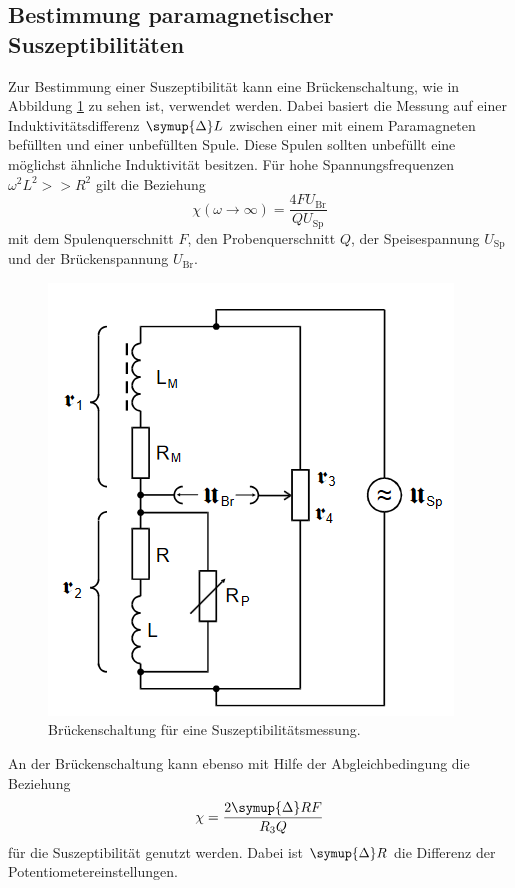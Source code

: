 \subsection{Bestimmung paramagnetischer Suszeptibilitäten}
Zur Bestimmung einer Suszeptibilität kann eine Brückenschaltung, wie in Abbildung \ref{fig:sus} zu sehen ist, verwendet werden. 
Dabei basiert die Messung auf einer Induktivitätsdifferenz $\symup{\Delta}L$ zwischen einer mit einem Paramagneten befüllten und einer unbefüllten Spule.
Diese Spulen sollten unbefüllt eine möglichst ähnliche Induktivität besitzen.
Für hohe Spannungsfrequenzen $\omega^2 L^2 >> R^2$ gilt die Beziehung
\begin{equation}
    \chi\left(\omega \to \infty \right) =\frac{4 F U_\text{Br}}{Q U_\text{Sp}}
    \label{eqn:chil}
\end{equation}
mit dem Spulenquerschnitt $F$, den Probenquerschnitt $Q$, der Speisespannung $U_\text{Sp}$ und der Brückenspannung $U_\text{Br}$.
\begin{figure}
    \centering
    \includegraphics[scale=0.4]{pics/sus.png}
    \caption{Brückenschaltung für eine Suszeptibilitätsmessung. \cite{v606}}
    \label{fig:sus}
  \end{figure}
An der Brückenschaltung kann ebenso mit Hilfe der Abgleichbedingung die Beziehung
\begin{equation}
    \chi = \frac{2 \symup{\Delta}R F}{R_3 Q}
    \label{eqn:chir}
\end{equation}
für die Suszeptibilität genutzt werden. Dabei ist $\symup{\Delta}R$ die Differenz der Potentiometereinstellungen.